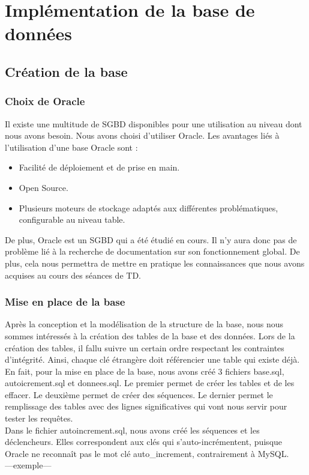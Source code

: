 \documentclass{article}
\begin{document}
\section{Implémentation de la base de données}
\subsection{Création de la base}

\subsubsection*{Choix de Oracle}
Il existe une multitude de SGBD disponibles pour une utilisation au niveau dont nous avons besoin. Nous avons choisi d'utiliser Oracle. Les avantages liés à l'utilisation d'une base Oracle sont :
\begin{itemize}
\item Facilité de déploiement et de prise en main.
\item Open Source.
\item Plusieurs moteurs de stockage adaptés aux différentes problématiques, configurable au niveau table. \\
\end{itemize}

De plus, Oracle est un SGBD qui a été étudié en cours. Il n'y aura donc pas de problème lié à la recherche de documentation sur son fonctionnement global. De plus, cela nous permettra de mettre en pratique les connaissances que nous avons acquises au cours des séances de TD.

\subsubsection*{Mise en place de la base}
Après la conception et la modélisation de la structure de la base, nous nous sommes intéressés à la création des tables de la base et des données. 
Lors de la création des tables, il fallu suivre un certain ordre respectant les contraintes d'intégrité. Ainsi, chaque clé étrangère doit référencier 
une table qui existe déjà. En fait, pour la mise en place de la base, nous avons créé 3 fichiers base.sql, autoicrement.sql et donnees.sql. Le premier permet de créer les tables et de les effacer. Le deuxième permet de créer des séquences. Le dernier permet 
le remplissage des tables avec des lignes significatives qui vont nous servir pour tester les requêtes. \\

Dans le fichier autoincrement.sql, nous avons créé les séquences et les déclencheurs. Elles correspondent aux clés qui s'auto-incrémentent, puisque Oracle ne reconnaît pas le mot clé auto\_increment, contrairement à MySQL. \\
---exemple---
\end{document}
